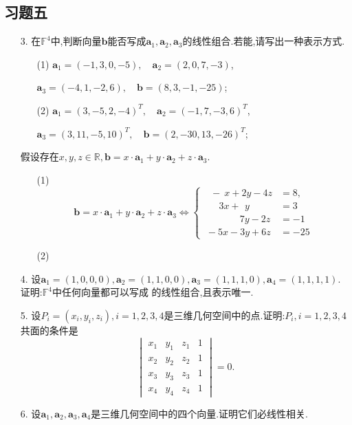 \documentclass{article}
\begin{document}
\subsection{习题五}
    \begin{enumerate}
        \item [3.]在$\mathbb{F}^4$中,判断向量$\boldsymbol{b}$能否写成$\boldsymbol{a}_1,\boldsymbol{a}_2,\boldsymbol{a}_3$的线性组合.若能,请写出一种表示方式.
        \begin{enumerate}
            \item [(1)]$\boldsymbol{a}_1=(-1,3,0,-5),\quad \boldsymbol{a}_2=(2,0,7,-3)$,
            \item []$\boldsymbol{a}_3=(-4,1,-2,6),\quad \boldsymbol{b}=(8,3,-1,-25)$;
            \item [(2)]$\boldsymbol{a}_1={(3,-5,2,-4)}^T,\quad \boldsymbol{a}_2={(-1,7,-3,6)}^T$,
            \item []$\boldsymbol{a}_3={(3,11,-5,10)}^T,\quad \boldsymbol{b}={(2,-30,13,-26)}^T$;
        \end{enumerate}
        假设存在$x,y,z\in \mathbb{R},\boldsymbol{b}=x\cdot\boldsymbol{a}_1+y\cdot\boldsymbol{a}_2+z\cdot\boldsymbol{a}_3$.
        \begin{enumerate}
            \item [(1)]
            \[
                \boldsymbol{b}=x\cdot\boldsymbol{a}_1+y\cdot\boldsymbol{a}_2+z\cdot\boldsymbol{a}_3
                \Leftrightarrow
                \begin{cases}
                    \ \ \ -\  x+2y-4z &=8,\\
                    \ \ \ \ \ \ \ 3x+\ \,y &=3\\
                    \ \ \ \ \qquad\ \ \ \, 7y-2z &= -1\\
                    \ -5x-3y+6z &=-25
                \end{cases}
            \]
            \item [(2)]
        \end{enumerate}
        \item [4.]设$\boldsymbol{a}_1=(1,0,0,0),\boldsymbol{a}_2=(1,1,0,0),\boldsymbol{a}_3=(1,1,1,0),\boldsymbol{a}_4=(1,1,1,1)$.
        证明:$\mathbb{F}^4$中任何向量都可以写成 的线性组合,且表示唯一.
        \item [5.]设$P_i=(x_i,y_i,z_i),i=1,2,3,4$是三维几何空间中的点.证明:$P_i,i=1,2,3,4$共面的条件是
        \[
            \begin{vmatrix}
                x_1 & y_1 & z_1 & 1\\
                x_2 & y_2 & z_2 & 1\\
                x_3 & y_3 & z_3 & 1\\
                x_4 & y_4 & z_4 & 1
            \end{vmatrix}=0.
        \]
        \item [6.]设$\boldsymbol{a}_1,\boldsymbol{a}_2,\boldsymbol{a}_3,\boldsymbol{a}_4$是三维几何空间中的四个向量.证明它们必线性相关.
    \end{enumerate}
\end{document}
